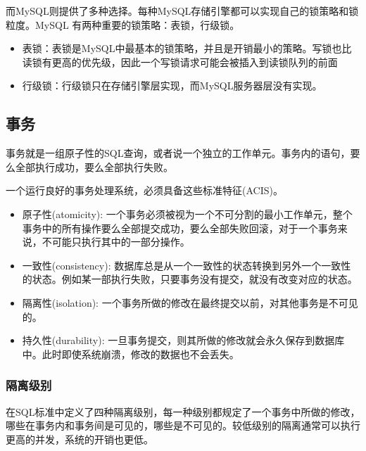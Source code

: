 而MySQL则提供了多种选择。每种MySQL存储引擎都可以实现自己的锁策略和锁粒度。MySQL 有两种重要的锁策略：表锁，行级锁。
\begin{itemize}
    \item 表锁：表锁是MySQL中最基本的锁策略，并且是开销最小的策略。写锁也比读锁有更高的优先级，因此一个写锁请求可能会被插入到读锁队列的前面
    \item 行级锁：行级锁只在存储引擎层实现，而MySQL服务器层没有实现。
\end{itemize}

\subsection{事务}

事务就是一组原子性的SQL查询，或者说一个独立的工作单元。事务内的语句，要么全部执行成功，要么全部执行失败。

一个运行良好的事务处理系统，必须具备这些标准特征(ACIS)。
\begin{itemize}
    \item 原子性(atomicity): 一个事务必须被视为一个不可分割的最小工作单元，整个事务中的所有操作要么全部提交成功，要么全部失败回滚，对于一个事务来说，不可能只执行其中的一部分操作。
    \item 一致性(consistency): 数据库总是从一个一致性的状态转换到另外一个一致性的状态。例如某一部执行失败，只要事务没有提交，就没有改变对应的状态。
    \item 隔离性(isolation): 一个事务所做的修改在最终提交以前，对其他事务是不可见的。
    \item 持久性(durability): 一旦事务提交，则其所做的修改就会永久保存到数据库中。此时即使系统崩溃，修改的数据也不会丢失。
\end{itemize}

\subsubsection*{隔离级别}

在SQL标准中定义了四种隔离级别，每一种级别都规定了一个事务中所做的修改，哪些在事务内和事务间是可见的，哪些是不可见的。较低级别的隔离通常可以执行更高的并发，系统的开销也更低。

